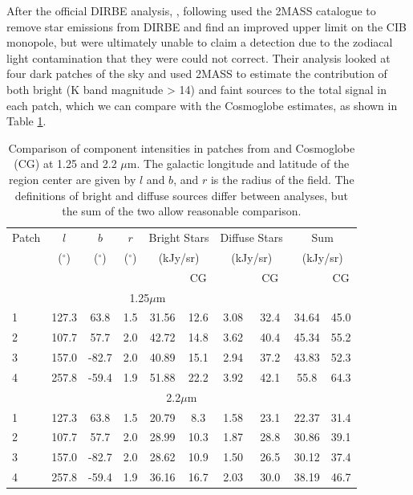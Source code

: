 \documentclass{aa}
\begin{document}
After the official DIRBE analysis, \cite{DIRBE2mass}, following \cite{gorjian} used the 2MASS catalogue to remove star emissions from DIRBE and find an improved upper limit on the CIB monopole, but were ultimately unable to claim a detection due to the zodiacal light contamination that they were could not correct. Their analysis looked at four dark patches of the sky and used 2MASS to estimate the contribution of both bright (K band magnitude > 14) and faint sources to the total signal in each patch, which we can compare with the Cosmoglobe estimates, as shown in Table \ref{tab:2mass}.

\begin{table}
    \centering
    \begin{tabular}{l c c c c c c c c c}
    \hline
    \hline
     Patch & $l$ & $b$ & $r$ & \multicolumn{2}{c}{Bright Stars} & \multicolumn{2}{c}{Diffuse Stars} & \multicolumn{2}{c}{Sum}\\ 
     & ($^{\circ}$) & ($^{\circ}$) & ($^{\circ}$) & \multicolumn{2}{c}{(kJy/sr)} & \multicolumn{2}{c}{(kJy/sr)} & \multicolumn{2}{c}{(kJy/sr)}\\
          &  & & & \cite{DIRBE2mass} & CG & \cite{DIRBE2mass} & CG  & \cite{DIRBE2mass} & CG\\
    \hline
    \hline
    \multicolumn{8}{c}{1.25$\mu$m}\\
    \hline
     1 \rule{0pt}{2ex} & 127.3 & 63.8 & 1.5 & 31.56 & 12.6 & 3.08 & 32.4 & 34.64 & 45.0\\
     2 & 107.7 & 57.7 & 2.0 & 42.72 & 14.8 & 3.62 & 40.4 & 45.34 & 55.2\\
     3 & 157.0 & -82.7 & 2.0 & 40.89 & 15.1 & 2.94 & 37.2 & 43.83 & 52.3\\
     4 & 257.8 & -59.4 & 1.9 & 51.88 & 22.2 & 3.92 & 42.1 & 55.8 & 64.3\\
     \hline
     \hline
     \multicolumn{10}{c}{2.2$\mu$m}\\
     \hline
     1 \rule{0pt}{2ex} & 127.3 & 63.8  & 1.5 & 20.79 & 8.3 & 1.58 & 23.1 & 22.37 & 31.4\\
     2 & 107.7 & 57.7 & 2.0 & 28.99 & 10.3 & 1.87 & 28.8 & 30.86 & 39.1\\
     3 & 157.0 & -82.7 & 2.0 & 28.62 & 10.9 & 1.50 & 26.5 & 30.12 & 37.4\\
     4 & 257.8 & -59.4 & 1.9 & 36.16 & 16.7 & 2.03 & 30.0 & 38.19 & 46.7\\
     \hline
    \end{tabular}
    \caption{Comparison of component intensities in patches from \cite{DIRBE2mass} and Cosmoglobe (CG) at 1.25 and 2.2 $\mu$m. The galactic longitude and latitude of the region center are given by $l$ and $b$, and $r$ is the radius of the field. The definitions of bright and diffuse sources differ between analyses, but the sum of the two allow reasonable comparison.}
    \label{tab:2mass}
\end{table}
\end{document}
